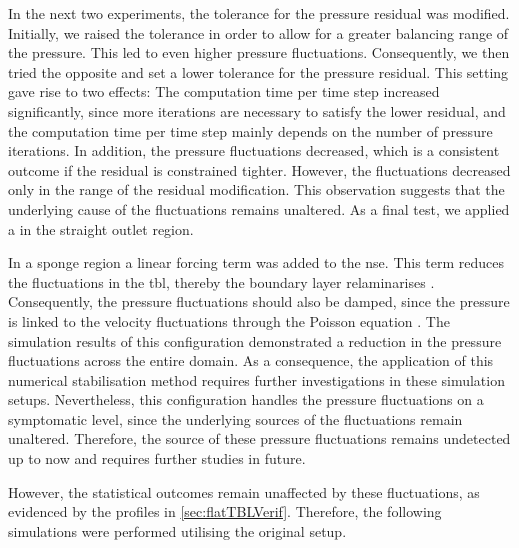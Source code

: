 In the next two experiments, the tolerance for the pressure residual was modified.
Initially, we raised the tolerance in order to allow for a greater balancing range of the pressure. 
This led to even higher pressure fluctuations.
Consequently, we then tried the opposite and set a lower tolerance for the pressure residual.
This setting gave rise to two effects:
The computation time per time step increased significantly, since more iterations are necessary to satisfy the lower residual, and the computation time per time step mainly depends on the number of pressure iterations.
In addition, the pressure fluctuations decreased, which is a consistent outcome if the residual is constrained tighter.
However, the fluctuations decreased only in the range of the residual modification.
This observation suggests that the underlying cause of the fluctuations remains unaltered.
As a final test, we applied a  in the straight outlet region. 


In a sponge region a linear forcing term was added to the \acrshort{nse}.
This term reduces the fluctuations in the \acrshort{tbl}, thereby the boundary layer relaminarises \citep{schlatter_turbulent_2012}.
Consequently, the pressure fluctuations should also be damped, since the pressure is linked to the velocity fluctuations through the Poisson equation \citep{pope_turbulent_2015}.
The simulation results of this configuration demonstrated a reduction in the pressure fluctuations across the entire domain.
As a consequence, the application of this numerical stabilisation method requires further investigations in these simulation setups.
Nevertheless, this configuration handles the pressure fluctuations on a symptomatic level, since the underlying sources of the fluctuations remain unaltered.
Therefore, the source of these pressure fluctuations remains undetected up to now and requires further studies in future. 

However, the statistical outcomes remain unaffected by these fluctuations, as evidenced by the profiles in \autoref{sec:flatTBLVerif}.
Therefore, the following simulations were performed utilising the original setup.


